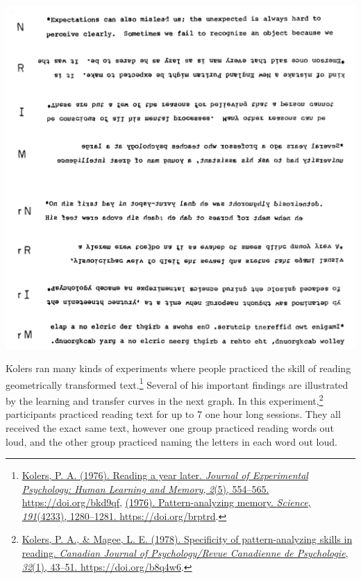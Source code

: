 \documentclass[
  oneside,
  12pt]{crumpbook}
\begin{document}
\begin{center}\includegraphics[width=1\linewidth]{imgs/Procedures_text} \end{center}

Kolers ran many kinds of experiments where people practiced the skill of reading geometrically transformed text.\footnote{\protect\hyperlink{ref-kolersReadingYearLater1976}{Kolers, P. A. (1976). Reading a year later. \emph{Journal of Experimental Psychology: Human Learning and Memory}, \emph{2}(5), 554--565. \url{https://doi.org/bkd9qf}}, \protect\hyperlink{ref-kolersPatternanalyzingMemory1976}{(1976). Pattern-analyzing memory. \emph{Science}, \emph{191}(4233), 1280--1281. \url{https://doi.org/brptrd}}.} Several of his important findings are illustrated by the learning and transfer curves in the next graph. In this experiment,\footnote{\protect\hyperlink{ref-kolersSpecificityPatternanalyzingSkills1978}{Kolers, P. A., \& Magee, L. E. (1978). Specificity of pattern-analyzing skills in reading. \emph{Canadian Journal of Psychology/Revue Canadienne de Psychologie}, \emph{32}(1), 43--51. \url{https://doi.org/b8q4w6}}.} participants practiced reading text for up to 7 one hour long sessions. They all received the exact same text, however one group practiced reading words out loud, and the other group practiced naming the letters in each word out loud.
\end{document}
